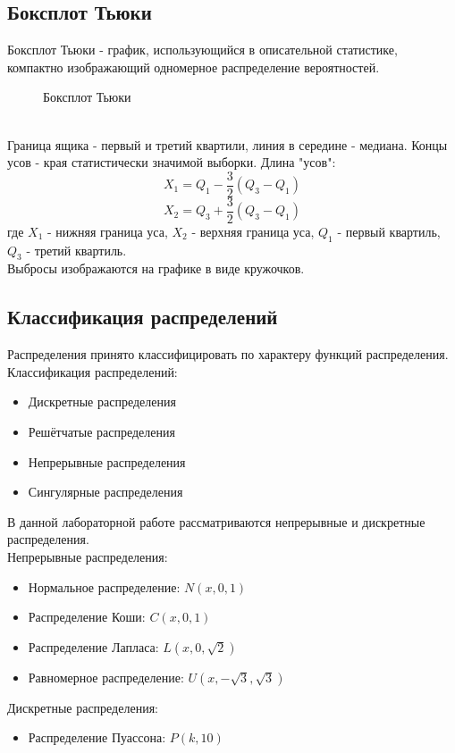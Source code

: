 \documentclass{article}
\begin{document}
\subsection{Боксплот Тьюки}
Боксплот Тьюки - график, использующийся в описательной статистике, компактно изображающий одномерное распределение вероятностей.
\begin{figure}[h]
\caption{Боксплот Тьюки}
\end{figure} \\
Граница ящика - первый и третий квартили, линия в середине - медиана. Концы усов - края статистически значимой выборки. Длина "усов":
\begin{equation}
X_1 = Q_1 - \frac{3}{2}(Q_3 - Q_1)
\label{eq:1}
\end{equation}
\begin{equation}
X_2 = Q_3 + \frac{3}{2}(Q_3 - Q_1)
\label{eq:2}
\end{equation}
где $X_1$ - нижняя граница уса, $X_2$ - верхняя граница уса, $Q_1$ - первый квартиль, $Q_3$ - третий квартиль. \\
Выбросы изображаются на графике в виде кружочков.
\subsection{Классификация распределений}
Распределения принято классифицировать по характеру функций распределения. \\
Классификация распределений:
\begin{itemize}
  \item Дискретные распределения
  \item Решётчатые распределения
  \item Непрерывные распределения
  \item Сингулярные распределения
\end{itemize}
В данной лабораторной работе рассматриваются непрерывные и дискретные распределения. \\
Непрерывные распределения:
\begin{itemize}
    \item Нормальное распределение: $N(x,0,1)$
    \item Распределение Коши: $C(x,0,1)$
    \item Распределение Лапласа: $L(x,0,\sqrt{2})$
    \item Равномерное распределение: $U(x,-\sqrt{3}, \sqrt{3})$
\end{itemize}
Дискретные распределения:
\begin{itemize}
    \item Распределение Пуассона: $P(k,10)$
  \end{itemize}
\end{document}
